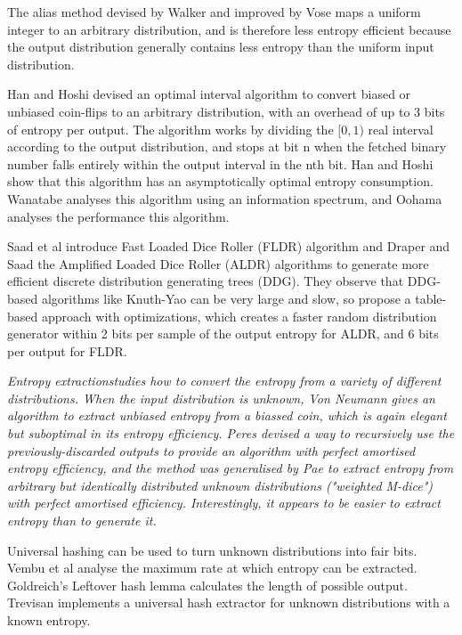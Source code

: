 \documentclass[12pt]{article}
\begin{document}
The alias method devised by Walker \cite{walker1977efficient} and improved by Vose \cite{vose91} maps a uniform integer to an arbitrary distribution, and is therefore less entropy efficient because the output distribution generally contains less entropy than the uniform input distribution.

Han and Hoshi \cite{han97} devised an optimal interval algorithm to convert biased or unbiased coin-flips to an arbitrary distribution, with an overhead of up to 3 bits of entropy per output.  The algorithm works by dividing the $[0,1)$ real interval according to the output distribution, and stops at bit n when the fetched binary number falls entirely within the output interval in the nth bit. Han and Hoshi show that this algorithm has an asymptotically optimal entropy consumption. 
Wanatabe \cite{wanatabe20} analyses this algorithm using an information spectrum, and Oohama \cite{oohama11, oohama2020performance} analyses the performance this algorithm.

Saad et al \cite{saad2020fldr} introduce Fast Loaded Dice Roller (FLDR) algorithm and Draper and Saad \cite{draper2025efficient} the Amplified Loaded Dice Roller (ALDR) algorithms to generate more efficient discrete distribution generating trees (DDG). They observe that DDG-based algorithms like Knuth-Yao can be very large and slow, so propose a table-based approach with optimizations, which creates a faster random distribution generator within 2 bits per sample of the output entropy for ALDR, and 6 bits per output for FLDR.

\em Entropy extraction\em studies how to convert the entropy \em from \em a variety of different distributions. When the input distribution is unknown, Von Neumann \cite{neumann51} gives an algorithm to extract unbiased entropy from a biassed coin, which is again elegant but suboptimal in its entropy efficiency. Peres \cite{peres1992iterating} devised a way to recursively use the previously-discarded outputs to provide an algorithm with perfect amortised entropy efficiency, and the method was generalised by Pae \cite{pae15} to extract entropy from arbitrary but identically distributed unknown distributions ("weighted M-dice") with perfect amortised efficiency. Interestingly, it appears to be easier to extract entropy than to generate it.

Universal hashing can be used to turn unknown distributions into fair bits. Vembu et al \cite{vembu95} analyse the maximum rate at which entropy can be extracted. Goldreich's Leftover hash lemma \cite{goldreich2004foundations} calculates the length of possible output. Trevisan \cite{trevisan2001extractors} implements a universal hash extractor for unknown distributions with a known entropy. 
\end{document}
